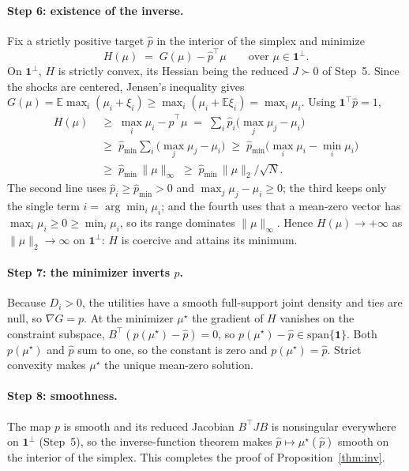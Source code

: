 \documentclass[12pt]{article}
\theoremstyle{remark}
\newcommand{\E}{\mathbb{E}}
\begin{document}
\paragraph{Step 6: existence of the inverse.} Fix a strictly positive
target $\hat p$ in the interior of the simplex and minimize
\[
H(\mu) \;=\; G(\mu) - \hat p^\top \mu
\qquad \text{over } \mu\in\mathbf{1}^\perp .
\]
On $\mathbf{1}^\perp$, $H$ is strictly convex, its Hessian being the
reduced $J\succ0$ of Step~5. Since the shocks are centered, Jensen's
inequality gives
$G(\mu)=\E\max_i(\mu_i+\xi_i) \ge \max_i(\mu_i+\E\xi_i) = \max_i\mu_i$.
Using $\mathbf{1}^\top\hat p = 1$,
\begin{align*}
H(\mu)
&\;\ge\; \max_i \mu_i - \hat p^\top\mu
\;=\; \sum_i \hat p_i\big(\max_j \mu_j - \mu_i\big) \\
&\;\ge\; \hat p_{\min}\sum_i\big(\max_j\mu_j - \mu_i\big)
\;\ge\; \hat p_{\min}\big(\max_i\mu_i - \min_i\mu_i\big) \\
&\;\ge\; \hat p_{\min}\,\|\mu\|_\infty
\;\ge\; \hat p_{\min}\,\|\mu\|_2/\sqrt{N} .
\end{align*}
The second line uses $\hat p_i\ge \hat p_{\min}>0$ and
$\max_j\mu_j-\mu_i\ge 0$; the third keeps only the single term
$i=\arg\min_i\mu_i$; and the fourth uses that a mean-zero vector has
$\max_i\mu_i\ge 0\ge\min_i\mu_i$, so its range dominates
$\|\mu\|_\infty$. Hence $H(\mu)\to+\infty$ as $\|\mu\|_2\to\infty$ on
$\mathbf{1}^\perp$: $H$ is coercive and attains its minimum.

\paragraph{Step 7: the minimizer inverts $p$.} Because $D_i>0$, the
utilities have a smooth full-support joint density and ties are null, so
$\nabla G = p$. At the minimizer $\mu^\star$ the gradient of $H$ vanishes
on the constraint subspace, $B^\top(p(\mu^\star)-\hat p)=0$, so
$p(\mu^\star)-\hat p\in\mathrm{span}\{\mathbf{1}\}$. Both $p(\mu^\star)$
and $\hat p$ sum to one, so the constant is zero and $p(\mu^\star)=\hat
p$. Strict convexity makes $\mu^\star$ the unique mean-zero solution.

\paragraph{Step 8: smoothness.} The map $p$ is smooth and its reduced
Jacobian $B^\top J B$ is nonsingular everywhere on $\mathbf{1}^\perp$
(Step~5), so the inverse-function theorem makes $\hat p\mapsto
\mu^\star(\hat p)$ smooth on the interior of the simplex. This completes
the proof of Proposition~\ref{thm:inv}.
\end{document}
